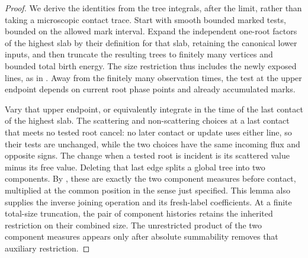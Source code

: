 \begin{proof}
We derive the identities from the tree integrals, after the limit,
rather than taking a microscopic contact trace.  Start with smooth
bounded marked tests, bounded on the allowed mark interval.  Expand the
independent one-root factors of the highest slab by their definition
for that slab, retaining the canonical lower inputs, and then truncate
the resulting trees to finitely many vertices and bounded total birth energy.
The size restriction thus includes the newly exposed lines, as in
.  Away from the finitely many
observation times, the test at the upper endpoint depends on current
root phase points and already accumulated marks.

Vary that upper endpoint, or equivalently integrate in the time of the
last contact of the highest slab.  The scattering and non-scattering
choices at a last contact that meets no tested root cancel: no later
contact or update uses either line, so their tests are unchanged, while
the two choices have the same incoming flux and opposite signs.
The change when a tested root is incident is its scattered value minus
its free value.  Deleting that last edge splits a global tree into two
components.  By , these are exactly the
two component measures before contact, multiplied at the common
position in the sense just specified.  This lemma also supplies the
inverse joining operation and its fresh-label coefficients.
At a finite total-size truncation, the pair of component histories
retains the inherited restriction on their combined size.  The
unrestricted product of the two component measures appears only
after absolute summability removes that auxiliary restriction.


\end{proof}
